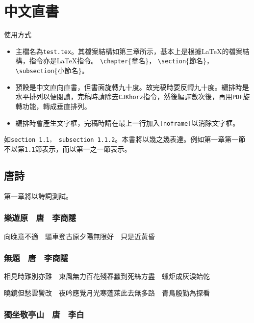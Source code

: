 \chapter{中文直書}
使用方式
\begin{itemize}
\item 主檔名為{\tt test.tex}。其檔案結構如第三章所示，基本上是根據\LaTeX{}的檔案結構，指令亦是\LaTeX{}指令。
{\tt \textbackslash chapter}\{章名\}，
{\tt \textbackslash section}\{節名\}，
{\tt \textbackslash subsection}\{小節名\}。
\item
預設是中文直向直書，但書面旋轉九十度。故完稿時要反轉九十度。編排時是水平排列以便閱讀，完稿時請除去{\tt CJKhorz}指令，然後編譯數次後，再用{\tt PDF}旋轉功能，轉成垂直排列。
\item
編排時會產生文字框，完稿時請在最上一行加入{\tt [noframe]}以消除文字框。
\end{itemize}
\begin{table}
\caption{中文圖表}
\end{table}
如{\tt section 1.1， subsection 1.1.2}。本書將以幾之幾表達。例如第一章第一節不以第{\tt 1.1}節表示，而以第一之一節表示。\cite{test}\cite{test2}
\section{唐詩}
第一章將以詩詞測試。
\subsection{樂遊原　唐　李商隱}

向晚意不適　驅車登古原夕陽無限好　只是近黃昏
\subsection{無題　唐　李商隱}

相見時難別亦難　東風無力百花殘春蠶到死絲方盡　蠟炬成灰淚始乾

曉鏡但愁雲鬢改　夜吟應覺月光寒蓬萊此去無多路　青鳥殷勤為探看
\subsection{獨坐敬亭山　唐　李白}

